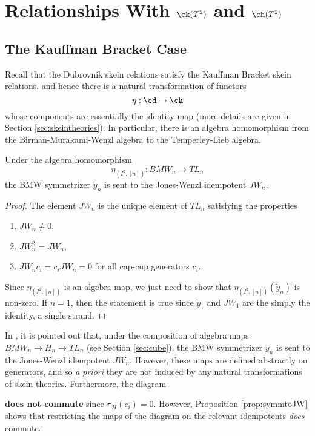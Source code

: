 \section{Relationships With $\ck(T^2)$ and $\ch(T^2)$}

\subsection{The Kauffman Bracket Case}

Recall that the Dubrovnik skein relations satisfy the Kauffman Bracket skein relations, and hence there is a natural transformation of functors
\[
\eta: \cd \to \ck
\]
whose components are essentially the identity map (more details are given in Section \ref{sec:skeintheories}). In particular, there is an algebra homomorphism from the Birman-Murakami-Wenzl algebra to the Temperley-Lieb algebra.

\begin{proposition} \label{prop:symmtoJW}
Under the algebra homomorphism
\[
\eta_{(I^2, [n])}: BMW_n \to TL_n
\]
the BMW symmetrizer $\tilde{y}_n$ is sent to the Jones-Wenzl idempotent $JW_n$.
\end{proposition}
\begin{proof}
The element $JW_n$ is the unique element of $TL_n$ satisfying the properties
\begin{enumerate}
\item $JW_n \neq 0$,
\item $JW_n^2 = JW_n$,
\item $JW_n c_i = c_i JW_n = 0$ for all cap-cup generators $c_i$. 
\end{enumerate}
Since $\eta_{(I^2, [n])}$ is an algebra map, we just need to show that $\eta_{(I^2, [n])}(\tilde{y}_n)$ is non-zero. If $n=1$, then the statement is true since $\tilde{y}_1$ and $JW_1$ are the simply the identity, a single strand. 
 
\end{proof}

\begin{remark}
In , it is pointed out that, under the composition of algebra maps $BMW_n \to H_n \to TL_n$ (see Section \ref{sec:cube}), the BMW symmetrizer $\tilde{y}_n$ is sent to the Jones-Wenzl idempotent $JW_n$. However, these maps are defined abstractly on generators, and so \textit{a priori} they are not induced by any natural transformations of skein theories. Furthermore, the diagram
\begin{center}
\end{center}
\textbf{does not commute} since $\pi_H(c_i)=0$. However, Proposition \ref{prop:symmtoJW} shows that restricting the maps of the diagram on the relevant idempotents \textit{does} commute.
\end{remark}

